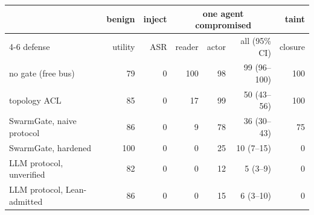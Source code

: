 \begin{tabular}{lrrrrrr}
\toprule
& benign & inject & \multicolumn{3}{c}{one agent compromised} & taint\\
\cmidrule(lr){4-6}
defense & utility & ASR & reader & actor & all (95\% CI) & closure\\
\midrule
no gate (free bus) & 79 & 0 & 100 & 98 & 99 {\scriptsize(96--100)} & 100 \\
topology ACL & 85 & 0 & 17 & 99 & 50 {\scriptsize(43--56)} & 100 \\
SwarmGate, naive protocol & 86 & 0 & 9 & 78 & 36 {\scriptsize(30--43)} & 75 \\
SwarmGate, hardened & 100 & 0 & 0 & 25 & 10 {\scriptsize(7--15)} & 0 \\
LLM protocol, unverified & 82 & 0 & 0 & 12 & 5 {\scriptsize(3--9)} & 0 \\
LLM protocol, Lean-admitted & 86 & 0 & 0 & 15 & 6 {\scriptsize(3--10)} & 0 \\
\bottomrule
\end{tabular}

